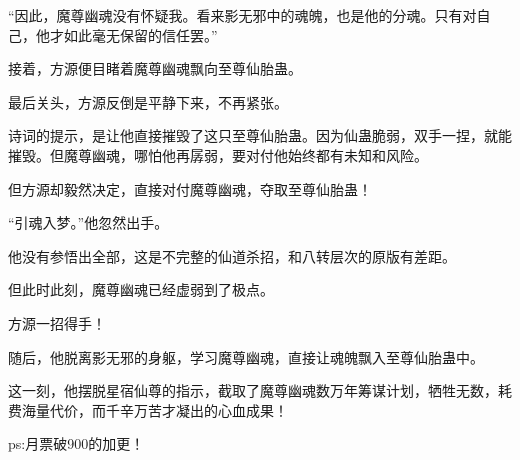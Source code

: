 \begin{this_body}
“因此，魔尊幽魂没有怀疑我。看来影无邪中的魂魄，也是他的分魂。只有对自己，他才如此毫无保留的信任罢。”

接着，方源便目睹着魔尊幽魂飘向至尊仙胎蛊。

最后关头，方源反倒是平静下来，不再紧张。

诗词的提示，是让他直接摧毁了这只至尊仙胎蛊。因为仙蛊脆弱，双手一捏，就能摧毁。但魔尊幽魂，哪怕他再孱弱，要对付他始终都有未知和风险。

但方源却毅然决定，直接对付魔尊幽魂，夺取至尊仙胎蛊！

“引魂入梦。”他忽然出手。

他没有参悟出全部，这是不完整的仙道杀招，和八转层次的原版有差距。

但此时此刻，魔尊幽魂已经虚弱到了极点。

方源一招得手！

随后，他脱离影无邪的身躯，学习魔尊幽魂，直接让魂魄飘入至尊仙胎蛊中。

这一刻，他摆脱星宿仙尊的指示，截取了魔尊幽魂数万年筹谋计划，牺牲无数，耗费海量代价，而千辛万苦才凝出的心血成果！

ps:月票破900的加更！

\end{this_body}

